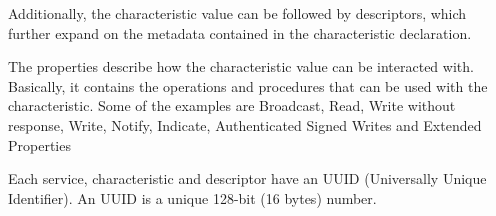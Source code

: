 Additionally, the characteristic value can be followed by descriptors, which further expand on the metadata contained in the characteristic declaration.

The properties describe how the characteristic value can be interacted with. Basically, it contains the operations and procedures that can be used with the characteristic. Some of the examples are Broadcast, Read, Write without response, Write, Notify, Indicate, Authenticated Signed Writes and Extended Properties

Each service, characteristic and descriptor have an UUID (Universally Unique Identifier). An UUID is a unique 128-bit (16 bytes) number.
